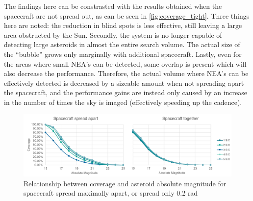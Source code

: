 The findings here can be constrasted with the results obtained when the spacecraft are not spread out, as can be seen in \autoref{fig:coverage_tight}. Three things here are noted: the reduction in blind spots is less effective, still leaving a large area obstructed by the Sun. Secondly, the system is no longer capable of detecting large asteroids in almost the entire search volume. The actual size of the ``bubble'' grows only marginally with additional spacecraft. Lastly, even for the areas where small NEA's can be detected, some overlap is present which will also decrease the performance. Therefore, the actual volume where NEA's can be effectively detected is decreased by a sizeable amount when not spreading apart the spacecraft, and the performance gains are instead only caused by an increase in the number of times the sky is imaged (effectively speeding up the cadence).\\

\begin{figure}[htbp]
 \centering
 \includegraphics[width=1.0\textwidth]{img/spread_coverage.png}
 \caption{Relationship between coverage and asteroid absolute magnitude for spacecraft spread maximally apart, or spread only 0.2 rad}
 \label{fig:spread_coverage}
\end{figure}

